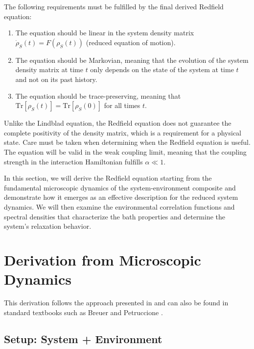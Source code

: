 \noindent
The following requirements must be fulfilled by the final derived Redfield equation:

\begin{enumerate}
	\item The equation should be linear in the system density matrix $\dot{\rho}_S(t) = F(\rho_S(t))$ (reduced equation of motion).
	\item The equation should be Markovian, meaning that the evolution of the system density matrix at time $t$ only depends on the state of the system at time $t$ and not on its past history.
	\item The equation should be trace-preserving, meaning that $\mathrm{Tr}[\rho_S(t)] = \mathrm{Tr}[\rho_S(0)]$ for all times $t$.
\end{enumerate}

\noindent
Unlike the Lindblad equation, the Redfield equation does not guarantee the complete positivity of the density matrix, which is a requirement for a physical state. Care must be taken when determining when the Redfield equation is useful. The equation will be valid in the weak coupling limit, meaning that the coupling strength in the interaction Hamiltonian fulfills $\alpha \ll 1$.



\noindent
In this section, we will derive the Redfield equation starting from the fundamental microscopic dynamics of the system-environment composite and demonstrate how it emerges as an effective description for the reduced system dynamics. We will then examine the environmental correlation functions and spectral densities that characterize the bath properties and determine the system's relaxation behavior.


\section{Derivation from Microscopic Dynamics}
\label{sec:Derivation_redfield_eq}

\noindent
This derivation follows the approach presented in \cite{manzano2020shortintroductionlindblad} and can also be found in standard textbooks such as Breuer and Petruccione \cite{breuerpetruccione2009theoryopenquantum}.

\subsection{Setup: System + Environment}

